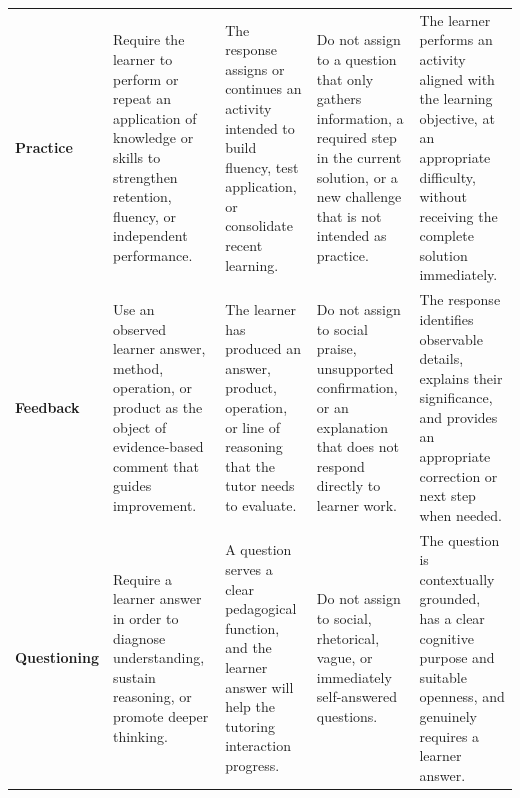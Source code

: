 \documentclass[conference]{IEEEtran}
\begin{document}
\begin{longtable}{P{0.12\textwidth}P{0.19\textwidth}P{0.20\textwidth}P{0.20\textwidth}P{0.20\textwidth}}
\textbf{Practice} & Require the learner to perform or repeat an application of knowledge or skills to strengthen retention, fluency, or independent performance. & The response assigns or continues an activity intended to build fluency, test application, or consolidate recent learning. & Do not assign to a question that only gathers information, a required step in the current solution, or a new challenge that is not intended as practice. & The learner performs an activity aligned with the learning objective, at an appropriate difficulty, without receiving the complete solution immediately. \\
\textbf{Feedback} & Use an observed learner answer, method, operation, or product as the object of evidence-based comment that guides improvement. & The learner has produced an answer, product, operation, or line of reasoning that the tutor needs to evaluate. & Do not assign to social praise, unsupported confirmation, or an explanation that does not respond directly to learner work. & The response identifies observable details, explains their significance, and provides an appropriate correction or next step when needed. \\
\textbf{Questioning} & Require a learner answer in order to diagnose understanding, sustain reasoning, or promote deeper thinking. & A question serves a clear pedagogical function, and the learner answer will help the tutoring interaction progress. & Do not assign to social, rhetorical, vague, or immediately self-answered questions. & The question is contextually grounded, has a clear cognitive purpose and suitable openness, and genuinely requires a learner answer. \\
\end{longtable}
\end{document}
